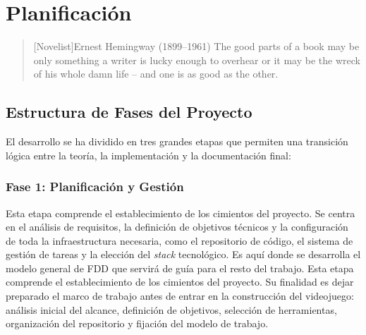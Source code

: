 \chapter{Planificación}

\begin{quotation}[Novelist]{Ernest Hemingway (1899--1961)}
The good parts of a book may be only something a writer is lucky enough to overhear or it may be the wreck of his whole damn life -- and one is as good as the other.
\end{quotation}

\begin{abstract}
Este capítulo detalla la organización temporal y la gestión de recursos del proyecto \textit{Via Inferni}. La planificación se estructura en tres fases principales que cubren desde la concepción inicial hasta el cierre definitivo de la memoria. Además, se presentan los diferentes planes de gestión basados en las mejores prácticas del estándar PMBOK, adaptados a la escala y necesidades de un Trabajo de Fin de Grado desarrollado por dos alumnos de ingeniería. El objetivo es garantizar una ejecución ordenada que cumpla con los plazos académicos y los requisitos de calidad técnica.
\end{abstract}

\section{Estructura de Fases del Proyecto}
El desarrollo se ha dividido en tres grandes etapas que permiten una transición lógica entre la teoría, la implementación y la documentación final:

\subsection{Fase 1: Planificación y Gestión}
Esta etapa comprende el establecimiento de los cimientos del proyecto. Se centra en el análisis de requisitos, la definición de objetivos técnicos y la configuración de toda la infraestructura necesaria, como el repositorio de código, el sistema de gestión de tareas y la elección del \textit{stack} tecnológico. Es aquí donde se desarrolla el modelo general de FDD que servirá de guía para el resto del trabajo.
Esta etapa comprende el establecimiento de los cimientos del proyecto. Su finalidad es dejar preparado el marco de trabajo antes de entrar en la construcción del videojuego: análisis inicial del alcance, definición de objetivos, selección de herramientas, organización del repositorio y fijación del modelo de trabajo.

